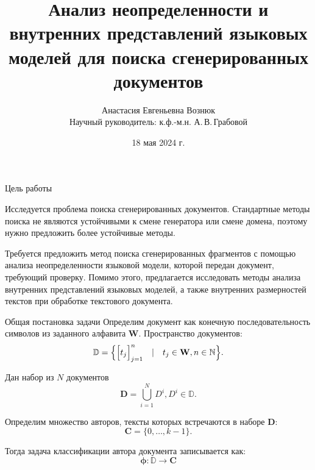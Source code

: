 \documentclass{beamer}
\title{{Анализ неопределенности и внутренних представлений языковых моделей для поиска сгенерированных документов}}
\author{
    Анастасия Евгеньевна Вознюк\\
    Научный руководитель: к.ф.-м.н. А.\,В.\,Грабовой
}
\date{18 мая 2024 г.}
\institute[МФТИ (НИУ)]{
    Кафедра интеллектуальных систем ФПМИ МФТИ\\
    Специализация: Интеллектуальный анализ данных\\
}
\date{\footnotesize
\par\bigskip\small 21 декабря 2024}
\begin{document}
\begin{frame}
\thispagestyle{empty}
\maketitle
\end{frame}
\begin{frame}{Цель работы}

Исследуется проблема поиска сгенерированных документов. Стандартные методы поиска не являются устойчивыми к смене генератора или смене домена, поэтому нужно предложить более устойчивые методы.

Требуется предложить метод поиска сгенерированных фрагментов с помощью анализа неопределенности языковой модели, которой передан документ, требующий проверку. Помимо этого, предлагается исследовать методы анализа внутренних представлений языковых моделей, а также внутренних размерностей текстов при обработке текстового документа.



\end{frame}

\begin{frame}{Общая постановка задачи}
Определим документ как конечную последовательность символов из заданного алфавита $\mathbf{W}$. Пространство документов:
$$\mathbb{D} = \Bigl\{\Big[t_j\Big]_{j=1}^n \quad|\quad t_j \in \mathbf{W}, n \in \mathbb{N}\Bigr\}.$$

Дан набор из $N$ документов
$$\mathbf{D} = \bigcup_{i=1}^{N}D^i, D^i \in \mathbb{D}.$$

Определим множество авторов, тексты которых встречаются в наборе $\mathbf{D}$:
$$\mathbf{C} = \{0, \dots, k - 1\}.$$


Тогда задача классификации автора документа записывается как: 
\begin{equation}
    \mathbf{\phi}: \mathbb{D} \rightarrow \mathbf{C}
\end{equation}
\end{frame}

\end{document}
